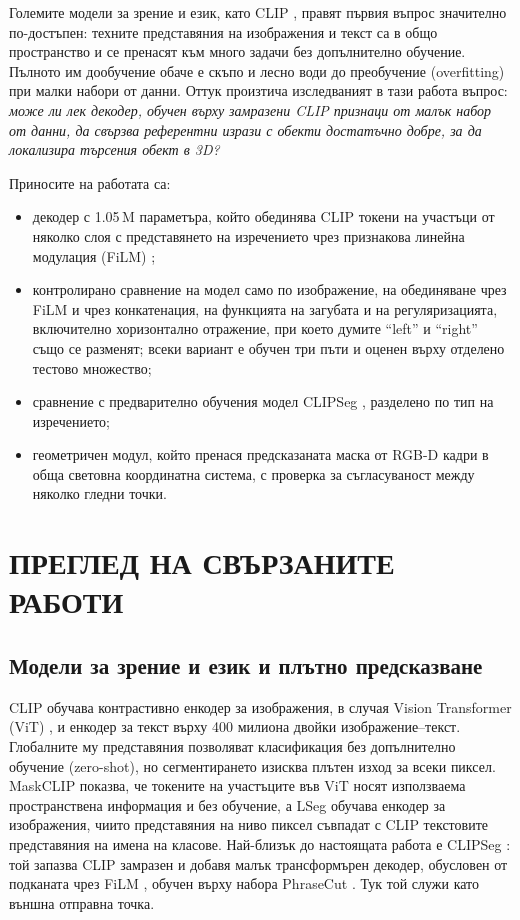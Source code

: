 \documentclass[conference,a4paper]{IEEEtran}
\newcommand{\bgsc}[2]{\texorpdfstring{#1{\footnotesize\MakeUppercase{#2}}}{#1#2}}
\newcommand{\en}[1]{\enquote{#1}}
\begin{document}
Големите модели за зрение и език, като CLIP \cite{radford2021clip}, правят първия въпрос значително
по-достъпен: техните представяния на изображения и текст са в общо пространство и се пренасят към много задачи без допълнително обучение. Пълното им дообучение обаче е скъпо и лесно води до преобучение
(overfitting) при малки набори от данни. Оттук произтича изследваният в тази работа въпрос:
\emph{може ли лек декодер, обучен върху замразени CLIP признаци от малък набор от данни, да свързва
референтни изрази с обекти достатъчно добре, за да локализира търсения обект в 3D?}

Приносите на работата са:
\begin{itemize}[\setlength{\IEEElabelindent}{0pt}]
\item декодер с 1.05\,M параметъра, който обединява CLIP токени на участъци от няколко слоя с
  представянето на изречението чрез признакова линейна модулация (FiLM) \cite{perez2018film};
\item контролирано сравнение на модел само по изображение, на обединяване чрез FiLM и чрез конкатенация, на функцията на загубата и на регуляризацията, включително хоризонтално отражение,
  при което думите \en{left} и \en{right} също се разменят; всеки вариант е обучен три пъти и
  оценен върху отделено тестово множество;
\item сравнение с предварително обучения модел CLIPSeg \cite{luddecke2022clipseg}, разделено по
  тип на изречението;
\item геометричен модул, който пренася предсказаната маска от RGB-D кадри в обща световна
  координатна система, с проверка за съгласуваност между няколко гледни точки.
\end{itemize}

\section{\bgsc{П}{реглед на свързаните работи}}
\label{sec:related}

\subsection{Модели за зрение и език и плътно предсказване}

CLIP \cite{radford2021clip} обучава контрастивно енкодер за изображения, в случая Vision Transformer
(ViT) \cite{dosovitskiy2021vit}, и енкодер за текст върху 400 милиона двойки изображение--текст.
Глобалните му представяния позволяват класификация без допълнително обучение (zero-shot), но
сегментирането изисква плътен изход за всеки пиксел. MaskCLIP \cite{zhou2022maskclip} показва, че
токените на участъците във ViT носят използваема пространствена информация и без обучение, а LSeg
\cite{li2022lseg} обучава енкодер за изображения, чиито представяния на ниво пиксел съвпадат с CLIP
текстовите представяния на имена на класове. Най-близък до настоящата работа е CLIPSeg
\cite{luddecke2022clipseg}: той запазва CLIP замразен и добавя малък трансформърен декодер,
обусловен от подканата чрез FiLM \cite{perez2018film}, обучен върху набора PhraseCut
\cite{wu2020phrasecut}. Тук той служи като външна отправна точка.
\end{document}
